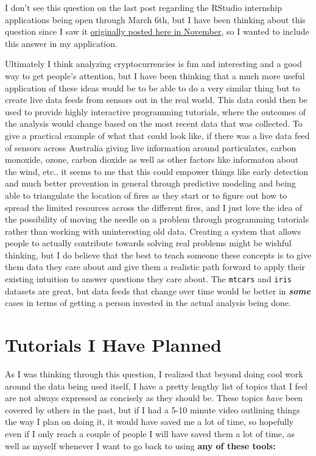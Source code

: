 \documentclass[
]{book}
\begin{document}
I don't see this question on the last post regarding the RStudio internship applications being open through March 6th, but I have been thinking about this question since I saw it \href{https://education.rstudio.com/blog/2019/11/rstudio-internships-2020-preview/}{originally posted here in November}, so I wanted to include this answer in my application.

Ultimately I think analyzing cryptocurrencies is fun and interesting and a good way to get people's attention, but I have been thinking that a much more useful application of these ideas would be to be able to do a very similar thing but to create live data feeds from sensors out in the real world. This data could then be used to provide highly interactive programming tutorials, where the outcomes of the analysis would change based on the most recent data that was collected. To give a practical example of what that could look like, if there was a live data feed of sensors across Australia giving live information around particulates, carbon monoxide, ozone, carbon dioxide as well as other factors like informaton about the wind, etc.. it seems to me that this could empower things like early detection and much better prevention in general through predictive modeling and being able to triangulate the location of fires as they start or to figure out how to spread the limited resources across the different fires, and I just love the idea of the possibility of moving the needle on a problem through programming tutorials rather than working with uninteresting old data. Creating a system that allows people to actually contribute towards solving real problems might be wishful thinking, but I do believe that the best to teach someone these concepts is to give them data they care about and give them a realistic path forward to apply their existing intuition to answer questions they care about. The \texttt{mtcars} and \texttt{iris} datasets are great, but data feeds that change over time would be better in \textbf{\emph{some}} cases in terms of getting a person invested in the actual analysis being done.

\hypertarget{tutorials-planned}{%
\section{Tutorials I Have Planned}\label{tutorials-planned}}

As I was thinking through this question, I realized that beyond doing cool work around the data being used itself, I have a pretty lengthy list of topics that I feel are not always expressed as concisely as they should be. These topics \emph{have} been covered by others in the past, but if I had a 5-10 minute video outlining things the way I plan on doing it, it would have saved me a lot of time, so hopefully even if I only reach a couple of people I will have saved them a lot of time, as well as myself whenever I want to go back to using \textbf{any of these tools:}
\end{document}
